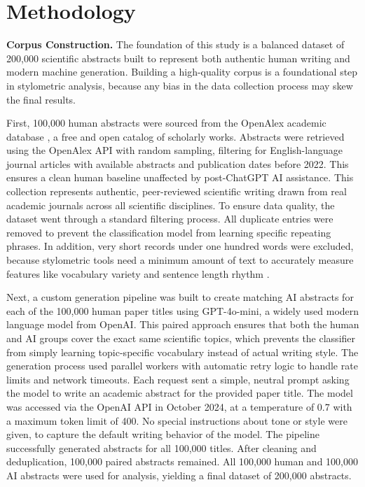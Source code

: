 \documentclass{article}
\begin{document}
\section{Methodology}

\textbf{Corpus Construction.} The foundation of this study is a balanced dataset of 200,000 scientific abstracts built to represent both authentic human writing and modern machine generation. Building a high-quality corpus is a foundational step in stylometric analysis, because any bias in the data collection process may skew the final results.

First, 100,000 human abstracts were sourced from the OpenAlex academic database \cite{ref13}, a free and open catalog of scholarly works. Abstracts were retrieved using the OpenAlex API with random sampling, filtering for English-language journal articles with available abstracts and publication dates before 2022. This ensures a clean human baseline unaffected by post-ChatGPT AI assistance. This collection represents authentic, peer-reviewed scientific writing drawn from real academic journals across all scientific disciplines. To ensure data quality, the dataset went through a standard filtering process. All duplicate entries were removed to prevent the classification model from learning specific repeating phrases. In addition, very short records under one hundred words were excluded, because stylometric tools need a minimum amount of text to accurately measure features like vocabulary variety and sentence length rhythm \cite{ref18}.

Next, a custom generation pipeline was built to create matching AI abstracts for each of the 100,000 human paper titles using GPT-4o-mini, a widely used modern language model from OpenAI. This paired approach ensures that both the human and AI groups cover the exact same scientific topics, which prevents the classifier from simply learning topic-specific vocabulary instead of actual writing style. The generation process used parallel workers with automatic retry logic to handle rate limits and network timeouts. Each request sent a simple, neutral prompt asking the model to write an academic abstract for the provided paper title. The model was accessed via the OpenAI API in October 2024, at a temperature of 0.7 with a maximum token limit of 400. No special instructions about tone or style were given, to capture the default writing behavior of the model. The pipeline successfully generated abstracts for all 100,000 titles. After cleaning and deduplication, 100,000 paired abstracts remained. All 100,000 human and 100,000 AI abstracts were used for analysis, yielding a final dataset of 200,000 abstracts.
\end{document}
